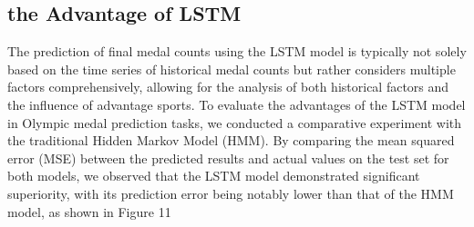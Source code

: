 \documentclass{mcmthesis}
\begin{document}
\subsection{the Advantage of LSTM}
The prediction of final medal counts using the LSTM model is typically not solely based on the time series of historical medal counts but rather considers multiple factors comprehensively, allowing for the analysis of both historical factors and the influence of advantage sports. To evaluate the advantages of the LSTM model in Olympic medal prediction tasks, we conducted a comparative experiment with the traditional Hidden Markov Model (HMM). By comparing the mean squared error (MSE) between the predicted results and actual values on the test set for both models, we observed that the LSTM model demonstrated significant superiority, with its prediction error being notably lower than that of the HMM model, as shown in Figure 11
\end{document}
